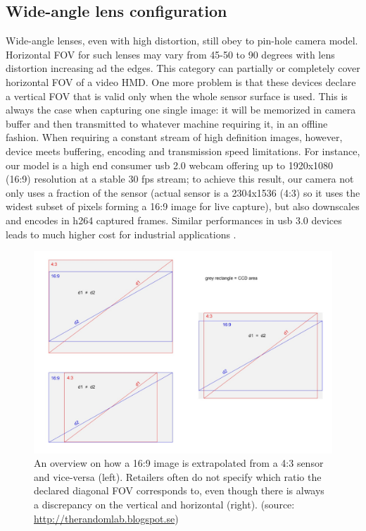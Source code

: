 \subsection{Wide-angle lens configuration}
Wide-angle lenses, even with high distortion, still obey to pin-hole camera model. Horizontal FOV for such lenses may vary from 45-50 to 90 degrees with lens distortion increasing ad the edges. This category can partially or completely cover horizontal FOV of a video HMD. One more problem is that these devices declare a vertical FOV that is valid only when the whole sensor surface is used. This is always the case when capturing one single image: it will be memorized in camera buffer and then transmitted to whatever machine requiring it, in an offline fashion. When requiring a constant stream of high definition images, however, device meets buffering, encoding and transmission speed limitations. For instance, our model is a high end consumer usb 2.0 webcam offering up to 1920x1080 (16:9) resolution at a stable 30 fps stream; to achieve this result, our camera not only uses a fraction of the sensor (actual sensor is a 2304x1536 (4:3) so it uses the widest subset of pixels forming a 16:9 image for live capture), but also downscales and encodes in h264 captured frames. Similar performances in usb 3.0 devices leads to much higher cost for industrial applications \cite{sub2r} \cite{ptgrey}.

\begin{figure}
\centering
\includegraphics[width=\linewidth]{schemas/diagonal_FOV}
\caption{An overview on how a 16:9 image is extrapolated from a 4:3 sensor and vice-versa (left). Retailers often do not specify which ratio the declared diagonal FOV corresponds to, even though there is always a discrepancy on the vertical and horizontal (right). (source: \href{http://therandomlab.blogspot.se/2013/03/logitech-c920-and-c910-fields-of-view.html}{http://therandomlab.blogspot.se})}
\label{fig:sensor_ratio}
\end{figure}

